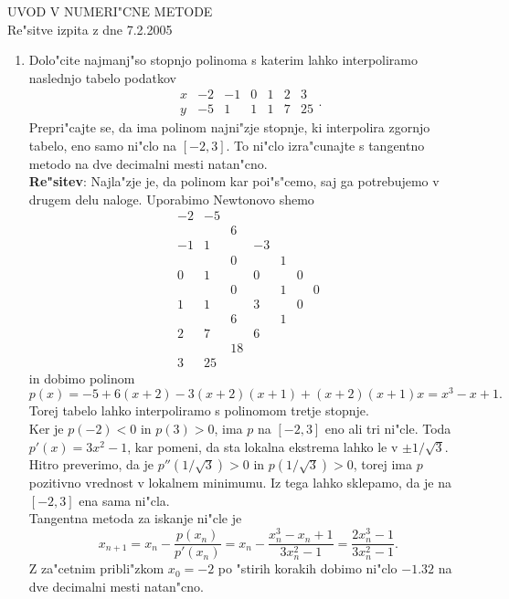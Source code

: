 \documentclass[12pt,a4paper]{article}
\begin{document}
\begin{center}
  {\large UVOD V NUMERI"CNE METODE\\
    Re"sitve izpita z dne 7.2.2005\\
    }
\end{center}
\vspace{0.5cm}

\begin{enumerate}

  \item Dolo"cite najmanj"so stopnjo polinoma s katerim
    lahko interpoliramo naslednjo tabelo podatkov
    $$\begin{array}{r|rrrrrr}
      x & -2 & -1 & 0 & 1 & 2 & 3\\ \hline
      y & -5 & 1  & 1 & 1 & 7 & 25
      \end{array}.
    $$
    Prepri"cajte se, da ima polinom najni"zje stopnje, ki interpolira
    zgornjo tabelo, eno samo ni"clo na $[-2,3]$. To ni"clo izra"cunajte s
    tangentno metodo na dve decimalni mesti natan"cno.\\
    {\bf Re"sitev}: Najla"zje je, da polinom kar poi"s"cemo, saj ga
    potrebujemo v drugem delu naloge. Uporabimo Newtonovo shemo
    $$\begin{array}{rrrrrrr}
      -2 & -5 &   &   &   &   &\\
         &    & 6 &   &   &   &\\
      -1 &  1 &   & -3&   &   &\\
         &    & 0 &   & 1 &   &\\
       0 &  1 &   & 0 &   & 0 &\\
         &    & 0 &   & 1 &   &0\\
       1 &  1 &   & 3 &   & 0 &\\
         &    & 6 &   & 1 &   &\\
       2 &  7 &   & 6 &   &   &\\
         &    & 18&   &   &   &\\
       3 & 25 &   &   &   &   &
      \end{array}
    $$
    in dobimo polinom 
    $$p(x)=-5+6(x+2)-3(x+2)(x+1)+(x+2)(x+1)x=
    x^3-x+1.$$ 
    Torej tabelo lahko interpoliramo s polinomom tretje stopnje.\\
    Ker je $p(-2)<0$ in $p(3)>0$, ima $p$ na $[-2,3]$ eno ali tri ni"cle.
    Toda $p'(x)=3x^2-1$, kar pomeni, da sta lokalna ekstrema lahko le
    v $\pm 1/\sqrt{3}$. Hitro preverimo, da je $p''(1/\sqrt{3})>0$ in
    $p(1/\sqrt{3})>0$, torej ima $p$ pozitivno vrednost v lokalnem
    minimumu. Iz tega lahko sklepamo, da je na $[-2,3]$ ena sama ni"cla.\\
    Tangentna metoda za iskanje ni"cle je
    $$x_{n+1}=x_n-\frac{p(x_n)}{p'(x_n)}=x_n-\frac{x_n^3-x_n+1}{3x_n^2-1}=
    \frac{2x_n^3-1}{3x_n^2-1}.$$
    Z za"cetnim pribli"zkom $x_0=-2$ po "stirih korakih dobimo ni"clo $-1.32$
    na dve decimalni mesti natan"cno.


\end{enumerate}
\end{document}
